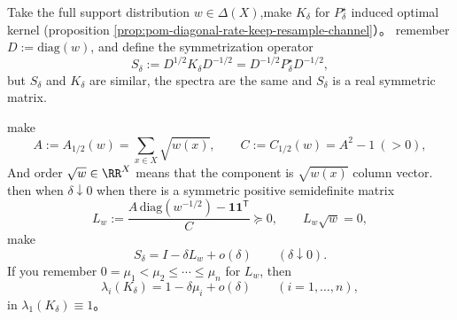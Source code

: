 \begin{theorem}\label{thm:pom-diagonal-rate-critical-line-laplacian-first-order}
Take the full support distribution \(w\in\Delta(X)\),make \(K_\delta\) for \(P^\star_\delta\) induced optimal kernel (proposition \ref{prop:pom-diagonal-rate-keep-resample-channel}）。
remember \(D:=\mathrm{diag}(w)\), and define the symmetrization operator
\[
S_\delta:=D^{1/2}K_\delta D^{-1/2}=D^{-1/2}P^\star_\delta D^{-1/2},
\]
but \(S_\delta\) and \(K_\delta\) are similar, the spectra are the same and \(S_\delta\) is a real symmetric matrix.
\par
make
\[
A:=A_{1/2}(w)=\sum_{x\in X}\sqrt{w(x)},\qquad
C:=C_{1/2}(w)=A^2-1\ (>0),
\]
And order \(\sqrt w\in\RR^X\) means that the component is \(\sqrt{w(x)}\) column vector.
then when \(\delta\downarrow 0\) when there is a symmetric positive semidefinite matrix
\[
L_w:=\frac{A\,\mathrm{diag}(w^{-1/2})-\mathbf 1\mathbf 1^{\mathsf T}}{C}\succeq 0,
\qquad
L_w\sqrt w=0,
\]
make
\[
S_\delta=I-\delta L_w+o(\delta)\qquad(\delta\downarrow 0).
\]
If you remember \(0=\mu_1<\mu_2\le\cdots\le\mu_n\) for \(L_w\), then
\[
\lambda_i(K_\delta)=1-\delta\mu_i+o(\delta)\qquad(i=1,\dots,n),
\]
in \(\lambda_1(K_\delta)\equiv 1\)。
\end{theorem}

